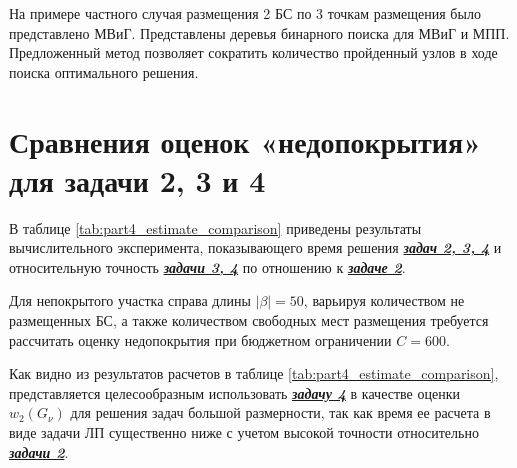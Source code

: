 На примере частного случая размещения 2 БС по 3 точкам размещения было представлено МВиГ. Представлены деревья бинарного поиска для МВиГ и МПП. Предложенный метод позволяет сократить количество пройденный узлов в ходе поиска оптимального решения. 








\section{Сравнения оценок «недопокрытия» для задачи 2, 3 и 4}\label{part4:task_234}

В таблице \cref{tab:part4_estimate_comparison} приведены результаты вычислительного эксперимента, показывающего время решения \underline{\textit{\textbf{задач 2, 3, 4}}} и относительную точность \underline{\textit{\textbf{задачи 3, 4}}} по отношению к \underline{\textit{\textbf{задаче 2}}}.

Для непокрытого участка справа длины $|\beta| = 50$, варьируя количеством не размещенных БС, а также количеством свободных мест размещения требуется рассчитать оценку недопокрытия при бюджетном ограничении $C=600$.


Как видно из результатов расчетов в таблице \cref{tab:part4_estimate_comparison}, представляется целесообразным  использовать  \underline{\textit{\textbf{задачу 4}}} в качестве оценки $w_2 (G_\nu )$ для решения задач большой размерности, так как время ее расчета в виде задачи ЛП существенно ниже с учетом высокой точности относительно \underline{\textit{\textbf{задачи 2}}}.


